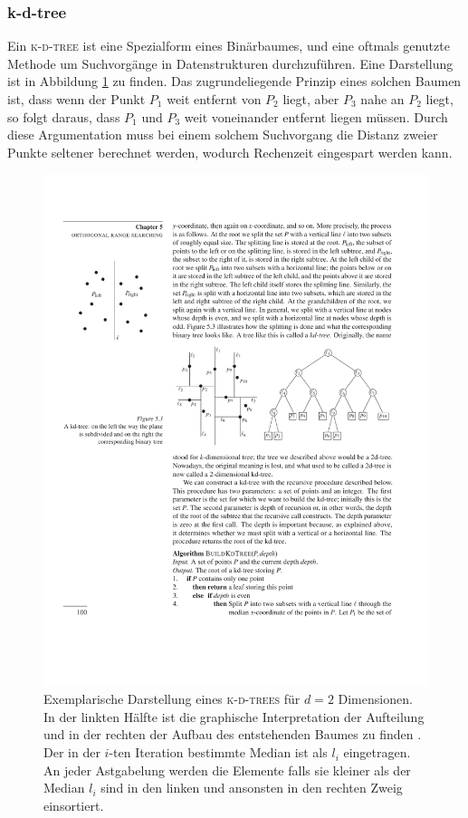 \subsubsection{k-d-tree}
Ein \textsc{k-d-tree} ist eine Spezialform eines Binärbaumes, und eine oftmals genutzte Methode um Suchvorgänge in Datenstrukturen durchzuführen. Eine Darstellung ist in Abbildung \ref{fig:kdtree} zu finden. Das zugrundeliegende Prinzip eines solchen Baumen ist, dass wenn der Punkt $P_1$ weit entfernt von $P_2$ liegt, aber $P_3$ nahe an $P_2$ liegt, so folgt daraus, dass $P_1$ und $P_3$ weit voneinander entfernt liegen müssen. Durch diese Argumentation muss bei einem solchem Suchvorgang die Distanz zweier Punkte seltener berechnet werden, wodurch Rechenzeit eingespart werden kann.\\

\begin{figure}[h]
    \centering
    \includegraphics[width = 0.9 \textwidth]{figures/illustrations/kdtree.pdf}
    \caption{Exemplarische Darstellung eines \textsc{k-d-trees} für $d=2$ Dimensionen. In der linkten Hälfte ist die graphische Interpretation der Aufteilung und in der rechten der Aufbau des entstehenden Baumes zu finden \cite{de2000computational}. Der in der $i$-ten Iteration bestimmte Median ist als $l_i$ eingetragen. An jeder Astgabelung werden die Elemente falls sie kleiner als der Median $l_i$ sind in den linken und ansonsten in den rechten Zweig einsortiert.}
    \label{fig:kdtree}
\end{figure}


